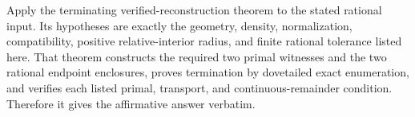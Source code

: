 Apply the terminating verified-reconstruction theorem to the stated rational
input.  Its hypotheses are exactly the geometry, density, normalization,
compatibility, positive relative-interior radius, and finite rational tolerance
listed here.  That theorem constructs the required two primal witnesses and
the two rational endpoint enclosures, proves termination by dovetailed exact
enumeration, and verifies each listed primal, transport, and continuous-remainder
condition.  Therefore it gives the affirmative answer verbatim.
